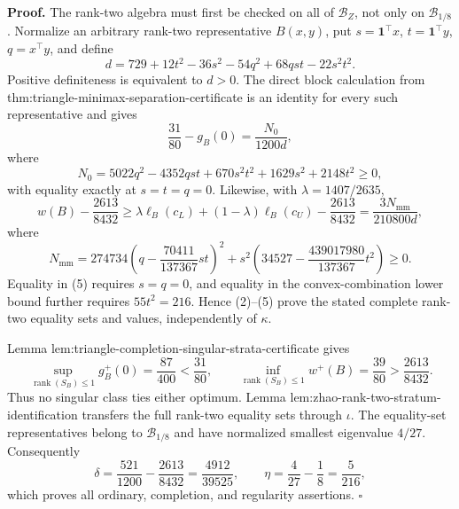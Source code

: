 \textbf{Proof.}
The rank-two algebra must first be checked on all of \(\mathcal B_Z\), not only on \(\mathcal B_{1/8}\).  Normalize an arbitrary rank-two representative \(B(x,y)\), put \(s=\mathbf1^{\top}x\), \(t=\mathbf1^{\top}y\), \(q=x^{\top}y\), and define
\[
d=729+12t^2-36s^2-54q^2+68qst-22s^2t^2.
\tag{1}
\]
Positive definiteness is equivalent to \(d>0\).  The direct block calculation from thm:triangle-minimax-separation-certificate is an identity for every such representative and gives
\[
\frac{31}{80}-g_B(0)=\frac{N_0}{1200d},
\tag{2}
\]
where
\[
N_0=5022q^2-4352qst+670s^2t^2+1629s^2+2148t^2\ge0,
\tag{3}
\]
with equality exactly at \(s=t=q=0\).  Likewise, with \(\lambda=1407/2635\),
\[
w(B)-\frac{2613}{8432}
\ge\lambda\ell_B(c_L)+(1-\lambda)\ell_B(c_U)-\frac{2613}{8432}
=\frac{3N_{\mathrm{mm}}}{210800d},
\tag{4}
\]
where
\[
N_{\mathrm{mm}}
=274734\left(q-\frac{70411}{137367}st\right)^2
+s^2\left(34527-\frac{439017980}{137367}t^2\right)\ge0.
\tag{5}
\]
Equality in (5) requires \(s=q=0\), and equality in the convex-combination lower bound further requires \(55t^2=216\).  Hence (2)--(5) prove the stated complete rank-two equality sets and values, independently of \(\kappa\).

Lemma lem:triangle-completion-singular-strata-certificate gives
\[
\sup_{\operatorname{rank}(S_B)\le1}g_B^+(0)=\frac{87}{400}<\frac{31}{80},
\qquad
\inf_{\operatorname{rank}(S_B)\le1}w^+(B)=\frac{39}{80}>\frac{2613}{8432}.
\tag{6}
\]
Thus no singular class ties either optimum.  Lemma lem:zhao-rank-two-stratum-identification transfers the full rank-two equality sets through \(\iota\).  The equality-set representatives belong to \(\mathcal B_{1/8}\) and have normalized smallest eigenvalue \(4/27\).  Consequently
\[
\delta=\frac{521}{1200}-\frac{2613}{8432}=\frac{4912}{39525},
\qquad
\eta=\frac4{27}-\frac18=\frac5{216},
\]
which proves all ordinary, completion, and regularity assertions. \(\square\)
